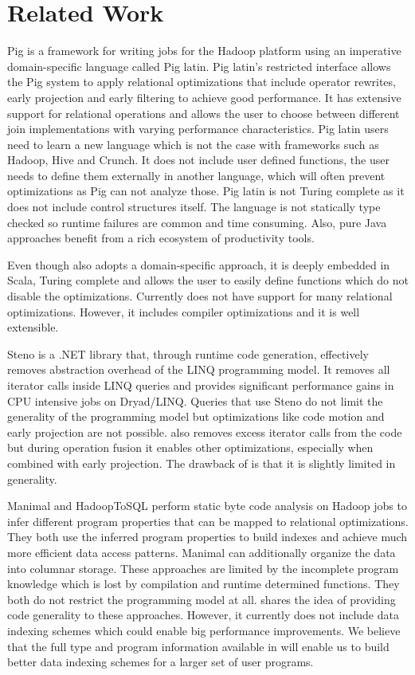 \section{Related Work}
\label{sec:related-work}

Pig \cite{olston_pig_2008-1} is a framework for writing jobs for the Hadoop
platform using an imperative domain-specific language called Pig latin. Pig
latin's restricted interface allows the Pig system to apply relational
optimizations that include operator rewrites, early projection and early
filtering to achieve good performance.
It has extensive support for relational operations and allows the user to choose
between different join implementations with varying performance characteristics.
Pig latin users need to learn a new language which is not the case with
frameworks such as Hadoop, Hive and Crunch. It does not include user defined
functions, the user needs to define them externally in another language, which
will often prevent optimizations as Pig can not analyze those. Pig latin is not
Turing complete as it does not include control structures itself.
The language is not statically type checked so runtime failures are common and
time consuming. Also, pure Java approaches benefit from a rich ecosystem of
productivity tools.

Even though \tool also adopts a domain-specific approach, it is deeply embedded
in Scala, Turing complete and allows the user to easily define functions which
do not disable the optimizations. Currently \tool does not have support for many
relational optimizations. However, it includes compiler optimizations and it is
well extensible.

Steno \cite{murray_steno:_2011} is a .NET library that, through runtime code
generation, effectively removes abstraction overhead of the LINQ programming
model. It removes all iterator calls inside LINQ queries and provides
significant performance gains in CPU intensive jobs on Dryad/LINQ. Queries that
use Steno do not limit the generality of the programming model but optimizations
like code motion and early projection are not possible.
\tool also removes excess iterator calls from the code but during operation
fusion it enables other optimizations, especially when combined with early
projection. The drawback of \tool is that it is slightly limited in generality.

Manimal \cite{jahani_automatic_2011} and HadoopToSQL \cite{iu_hadooptosql:_2010}
perform static byte code analysis on Hadoop jobs to infer different program
properties that can be mapped to relational optimizations. They both use the
inferred program properties to build indexes and achieve much more efficient
data access patterns. Manimal can additionally organize the data into columnar
storage. These approaches are limited by the incomplete program knowledge which
is lost by compilation and runtime determined functions. They both do not
restrict the programming model at all.
\tool shares the idea of providing code generality to these approaches. However,
it currently does not include data indexing schemes which could enable big
performance improvements. We believe that the full type and program information
available in \tool will enable us to build better data indexing schemes for a
larger set of user programs.
